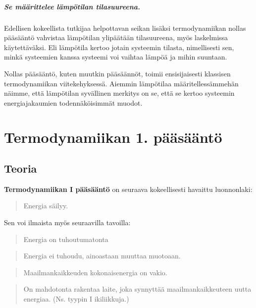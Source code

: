 \documentclass[12pt,a4paper,finnish]{book}
\begin{document}
\paragraph{Se määrittelee lämpötilan tilasuureena.}

Edellisen kokeellista tutkijaa helpottavan seikan lisäksi termodynamiikan nollas pääsääntö vahvistaa lämpötilan 
ylipäätään tilasuureena, myös laskelmissa käytettäväksi. Eli lämpötila kertoo jotain systeemin tilasta, 
nimellisesti sen, minkä systeemien kanssa systeemi voi vaihtaa lämpöä ja mihin suuntaan.

Nollas pääsääntö, kuten muutkin pääsäännöt, toimii ensisijaisesti klassisen termodynamiikan viitekehyksessä. 
Aiemmin lämpötilaa määritellessämmehän näimme, että lämpötilan syvällinen merkitys on se, että se kertoo 
systeemin energiajakaumien todennäköisimmät muodot.

\chapter{Termodynamiikan 1. pääsääntö} %

\section{Teoria} %

\textbf{Termodynamiikan I pääsääntö} on seuraava kokeellisesti havaittu luonnonlaki:

\begin{quote}
 Energia säilyy.
\end{quote}

Sen voi ilmaista myös seuraavilla tavoilla:

\begin{quote}
 Energia on tuhoutumatonta
\end{quote}

\begin{quote}
 Energia ei tuhoudu, ainoastaan muuttaa muotoaan.
\end{quote}

\begin{quote}
 Maailmankaikkeuden kokonaisenergia on vakio.
\end{quote}

\begin{quote}
 On mahdotonta rakentaa laite, joka synnyttää maailmankaikkeuteen uutta energiaa. (Ns. tyypin I ikiliikkuja.)
\end{quote}
\end{document}

